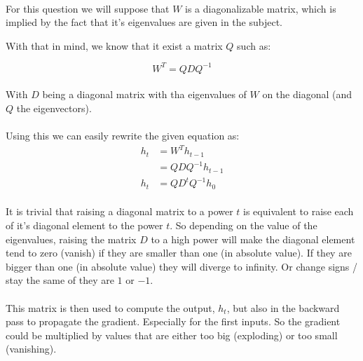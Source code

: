 
\paragraph{}
For this question we will suppose that $W$ is a diagonalizable matrix, which is implied by the fact that it's
eigenvalues are given in the subject.

With that in mind, we know that it exist a matrix $Q$ such as:

\[
    W^T = Q D Q^{-1}
\]

\paragraph{}
With $D$ being a diagonal matrix with tha eigenvalues of $W$ on the diagonal (and $Q$ the eigenvectors).

\paragraph{}
Using this we can easily rewrite the given equation as:
\begin{align*}
    h_t &= W^T h_{t-1} \\
        &= Q D Q^{-1} h_{t-1} \\
    h_t &= Q D^t Q^{-1} h_{0}
\end{align*}

\paragraph{}
It is trivial that raising a diagonal matrix to a power $t$ is equivalent to raise each of it's diagonal element to the
power $t$.
So depending on the value of the eigenvalues, raising the matrix $D$ to a high power will make the diagonal element
tend to zero (vanish) if they are smaller than one (in absolute value).
If they are bigger than one (in absolute value) they will diverge to infinity.
Or change signs / stay the same of they are $1$ or $-1$.

\paragraph{}
This matrix is then used to compute the output, $h_t$, but also in the backward pass to propagate the gradient.
Especially for the first inputs.
So the gradient could be multiplied by values that are either too big (exploding) or too small (vanishing).

